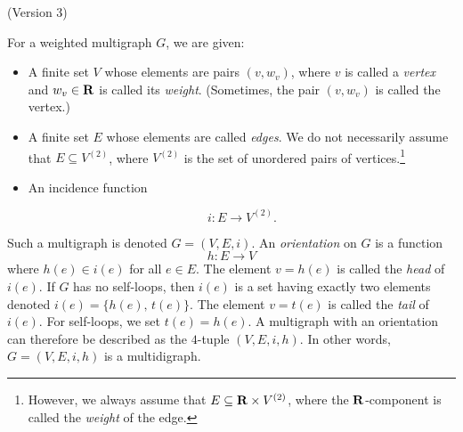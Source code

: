 \begin{definition} (Version 3)
{\rm
For a weighted multigraph $G$, we are
given:
%
\begin{itemize}
\item A finite set $V$ whose elements are pairs $(v, w_v)$, where $v$
  is called a \emph{vertex} and $w_v \in \mathbf{R}$
  is called its \emph{weight}. (Sometimes,
  the pair $(v, w_v)$ is called the vertex.)

\item A finite set $E$ whose elements are called
  \emph{edges}. We do not necessarily assume
  that $E \subseteq V^{(2)}$, where $V^{(2)}$ is the set of unordered
  pairs of vertices.\footnote{
    However, we always assume that $E \subseteq \mathbf{R} \times V^{(2)}$,
    where the $\mathbf{R}$-component is called the
    \emph{weight} of the edge.
  }

\item An incidence function

\begin{equation}
\label{eqn:introduction:edge_incidence}
i: E \to V^{(2)}.
\end{equation}
\end{itemize}
%
Such a multigraph is denoted $G = (V,E,i)$. An
\emph{orientation} on $G$ is a function
%
\begin{equation}
\label{eqn:introduction:edge_orientation}
h: E \to V
\end{equation}
%
where $h(e) \in i(e)$ for all $e \in E$. The element $v = h(e)$ is
called the \emph{head} of $i(e)$. If $G$ has no self-loops, then
$i(e)$ is a set having exactly two elements denoted
$i(e) = \{h(e),\, t(e)\}$. The element $v = t(e)$ is called the
\emph{tail} of $i(e)$. For self-loops, we set $t(e) = h(e)$. A
multigraph with an orientation can therefore be described as the
$4$-tuple $(V, E, i, h)$. In other words, $G = (V,E,i,h)$ is a
multidigraph.
}
\end{definition}

